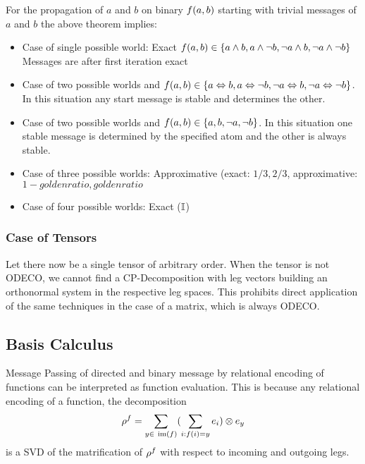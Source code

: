 For the propagation of $a$ and $b$ on binary $f(a, b)$ starting with trivial messages of $a$ and $b$ the above theorem implies:
\begin{itemize}
	\item Case of single possible world: Exact 
		$f(a, b) \in \{ a \land b, a \land \lnot b, \lnot a \land b, \lnot a \land \lnot b \}$
		Messages are after first iteration exact
	\item Case of two possible worlds and $f(a, b) \in \{ a \Leftrightarrow b, a \Leftrightarrow \lnot b, \lnot a \Leftrightarrow b, \lnot a \Leftrightarrow \lnot b \}$. 
		In this situation any start message is stable and determines the other.
	\item Case of two possible worlds and $f(a, b) \in \{ a, b, \lnot a, \lnot b\}$.
		In this situation one stable message is determined by the specified atom and the other is always stable.
	\item Case of  three possible worlds: Approximative (exact: $1/3, 2/3$, approximative: $1-golden ratio, golden ratio$
	\item Case of four possible worlds: Exact ($\mathbb{I}$) 
\end{itemize}


\subsubsection{Case of Tensors}

Let there now be a single tensor of arbitrary order.
When the tensor is not ODECO, we cannot find a CP-Decomposition with leg vectors building an orthonormal system in the respective leg spaces.
This prohibits direct application of the same techniques in the case of a matrix, which is always ODECO.



\subsection{Basis Calculus}

Message Passing of directed and binary message by relational encoding of functions can be interpreted as function evaluation.
This is because any relational encoding of a function, the decomposition
\begin{align*}
	\rencodingof{\exfunction} = \sum_{y \in \imageof{\exfunction}} ( \sum_{i: \exfunction(i)=y}\onehotmapof{i} )  \otimes \onehotmapof{y}
\end{align*}
is a SVD of the matrification of $\rho^{f}$ with respect to incoming and outgoing legs.


